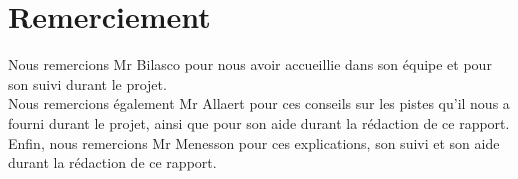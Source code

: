 \section*{Remerciement}

Nous remercions Mr Bilasco pour nous avoir accueillie dans son équipe et pour son 
suivi durant le projet.\\

Nous remercions également Mr Allaert pour ces conseils sur les pistes qu'il nous
a fourni durant le projet, ainsi que pour son aide durant la rédaction de ce rapport.\\

Enfin, nous remercions Mr Menesson pour ces explications, son suivi et son aide 
durant la rédaction de ce rapport.
\newpage